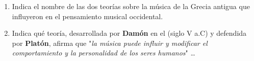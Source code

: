 \documentclass[letterpaper,12pt,notitlepage,spanish]{article}
\begin{document}
 \begin{ejercicio}
		\begin{enumerate}[1.-]
%
%
		\item Indica el nombre de las dos teorías sobre la música de la Grecia antigua que influyeron en el pensamiento musical occidental.
		\vspace*{1.10cm}
		\item Indica qué teoría, desarrollada por \textbf{Damón} en el (siglo V a.C) y defendida por \textbf{Platón}, afirma que "\textit{la música puede influir y modificar el comportamiento y la personalidad de los seres humanos}" \ldots
		\vspace*{0.50cm}
%
		\end{enumerate}
 \end{ejercicio}
%
\end{document}

